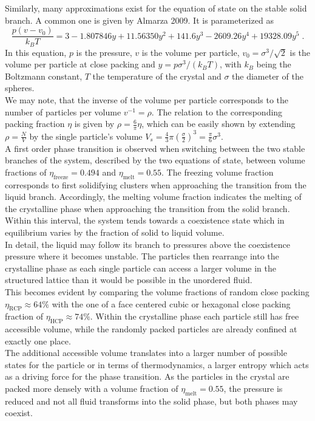 Similarly, many approximations exist for the equation of state on the stable solid branch. A common one is given by Almarza 2009\cite{Almarza2009}. It is parameterized as
\begin{equation}
\frac{p(v-v_0)}{k_B T} = 3 - 1.807846 y + 11.56350 y^2 + 141.6 y^3 - 2609.26 y^4 + 19328.09 y^5 \; \text{.}
\end{equation}
In this equation, $p$ is the pressure, $v$ is the volume per particle, $v_0=\sigma^3/\sqrt{2}$ is the volume per particle at close packing and $y=p \sigma^3 / (k_B T)$, with $k_B$ being the Boltzmann constant, $T$ the temperature of the crystal and $\sigma$ the diameter of the spheres.\\
We may note, that the inverse of the volume per particle corresponds to the number of particles per volume $ v^{-1} = \rho$. The relation to the corresponding packing fraction $\eta$ is given by $\rho = \frac{6}{ \pi} \eta$, which can be easily shown by extending $\rho = \frac{N}{V}$ by the single particle's volume $V_s = \frac{4}{3} \pi \left(\frac{\sigma}{2}\right)^3 = \frac{\pi}{6} \sigma^3$.\\

A first order phase transition is observed when switching between the two stable branches of the system, described by the two equations of state, between volume fractions of $\eta_{\text{freeze}} = 0.494$ and $\eta_{\text{melt}}=0.55$. The freezing volume fraction corresponds to first solidifying clusters when approaching the transition from the liquid branch. Accordingly, the melting volume fraction indicates the melting of the crystalline phase when approaching the transition from the solid branch. Within this interval, the system tends towards a coexistence state which in equilibrium varies by the fraction of solid to liquid volume.\\
In detail, the liquid may follow its branch to pressures above the coexistence pressure where it becomes unstable. The particles then rearrange into the crystalline phase as each single particle can access a larger volume in the structured lattice than it would be possible in the unordered fluid.\\
This becomes evident by comparing the volume fractions of random close packing $\eta_{\text{RCP}}\approx 64\%$ with the one of a face centered cubic or hexagonal close packing fraction of $\eta_{\text{HCP}} \approx 74 \%$. Within the crystalline phase each particle still has free accessible volume, while the randomly packed particles are already confined at exactly one place.\\
The additional accessible volume translates into a larger number of possible states for the particle or in terms of thermodynamics, a larger entropy which acts as a driving force for the phase transition. As the particles in the crystal are packed more densely with a volume fraction of $\eta_{\text{melt}}=0.55$, the pressure is reduced and not all fluid transforms into the solid phase, but both phases may coexist.\\

